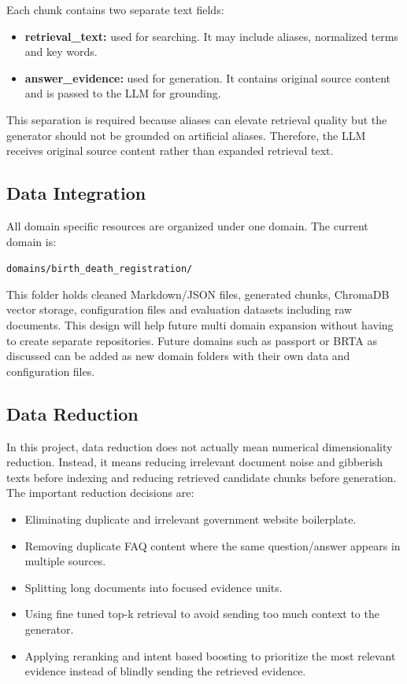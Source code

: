 \documentclass[12pt,oneside,openany]{report}
\begin{document}
Each chunk contains two separate text fields:

\begin{itemize}
    \item \textbf{retrieval\_text:} used for searching. It may include aliases, normalized terms and key words.
    \item \textbf{answer\_evidence:} used for generation. It contains original source content and is passed to the LLM for grounding.
\end{itemize}

This separation is required because aliases can elevate retrieval quality but the generator should not be grounded on artificial aliases. Therefore, the LLM receives original source content rather than expanded retrieval text.

\subsection{Data Integration}

All domain specific resources are organized under one domain. The current domain is:

\begin{center}
\texttt{domains/birth\_death\_registration/}
\end{center}

This folder holds cleaned Markdown/JSON files, generated chunks, ChromaDB vector storage, configuration files and evaluation datasets including raw documents. This design will help future multi domain expansion without having to create separate repositories. Future domains such as passport or BRTA as discussed can be added as new domain folders with their own data and configuration files.

\subsection{Data Reduction}

In this project, data reduction does not actually mean numerical dimensionality reduction. Instead, it means reducing irrelevant document noise and gibberish texts before indexing and reducing retrieved candidate chunks before generation. The important reduction decisions are:

\begin{itemize}
    \item Eliminating duplicate and irrelevant government website boilerplate.
    \item Removing duplicate FAQ content where the same question/answer appears in multiple sources.
    \item Splitting long documents into focused evidence units.
    \item Using fine tuned top-k retrieval to avoid sending too much context to the generator.
    \item Applying reranking and intent based boosting to prioritize the most relevant evidence instead of blindly sending the retrieved evidence.
\end{itemize}
\end{document}
